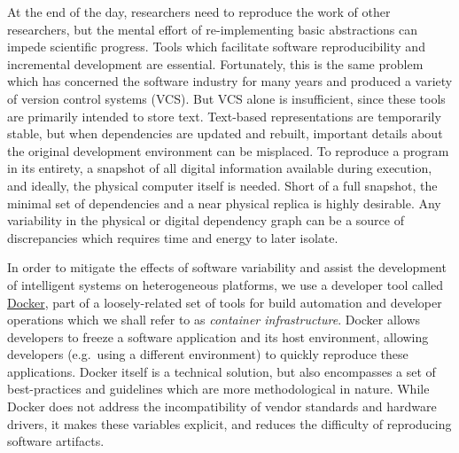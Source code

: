 \documentclass[12pt,initial,twoside,maitrise]{dms}
\numberwithin{equation}{section}
\numberwithin{table}{chapter}
\numberwithin{figure}{chapter}
\begin{document}
At the end of the day, researchers need to reproduce the work of other researchers, but the mental effort of re-implementing basic abstractions can impede scientific progress. Tools which facilitate software reproducibility and incremental development are essential. Fortunately, this is the same problem which has concerned the software industry for many years and produced a variety of version control systems (VCS). But VCS alone is insufficient, since these tools are primarily intended to store text. Text-based representations are temporarily stable, but when dependencies are updated and rebuilt, important details about the original development environment can be misplaced. To reproduce a program in its entirety, a snapshot of all digital information available during execution, and ideally, the physical computer itself is needed. Short of a full snapshot, the minimal set of dependencies and a near physical replica is highly desirable. Any variability in the physical or digital dependency graph can be a source of discrepancies which requires time and energy to later isolate.

In order to mitigate the effects of software variability and assist the development of intelligent systems on heterogeneous platforms, we use a developer tool called \href{https://www.docker.com}{Docker}, part of a loosely-related set of tools for build automation and developer operations which we shall refer to as \textit{container infrastructure}. Docker allows developers to freeze a software application and its host environment, allowing developers (e.g.~using a different environment) to quickly reproduce these applications. Docker itself is a technical solution, but also encompasses a set of best-practices and guidelines which are more methodological in nature. While Docker does not address the incompatibility of vendor standards and hardware drivers, it makes these variables explicit, and reduces the difficulty of reproducing software artifacts.
\end{document}
